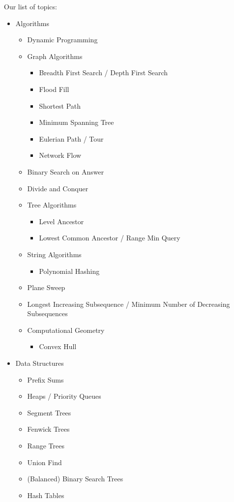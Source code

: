 \documentclass[11pt, oneside]{article}   	%
\begin{document}
Our list of topics:
\begin{itemize}
\item Algorithms
\begin{itemize}
\item Dynamic Programming
\item Graph Algorithms
\begin{itemize}
\item Breadth First Search / Depth First Search
\item Flood Fill
\item Shortest Path
\item Minimum Spanning Tree
\item Eulerian Path / Tour
\item Network Flow
\end{itemize}
\item Binary Search on Answer
\item Divide and Conquer
\item Tree Algorithms
\begin{itemize}
\item Level Ancestor
\item Lowest Common Ancestor / Range Min Query
\end{itemize}
\item String Algorithms
\begin{itemize}
\item Polynomial Hashing
\end{itemize}
\item Plane Sweep
\item Longest Increasing Subsequence / Minimum Number of Decreasing Subsequences
\item Computational Geometry
\begin{itemize}
\item Convex Hull
\end{itemize}
\end{itemize}
\item Data Structures
\begin{itemize}
\item Prefix Sums
\item Heaps / Priority Queues
\item Segment Trees
\item Fenwick Trees
\item Range Trees
\item Union Find
\item (Balanced) Binary Search Trees
\item Hash Tables
\end{itemize}
\end{itemize}
\end{document}
